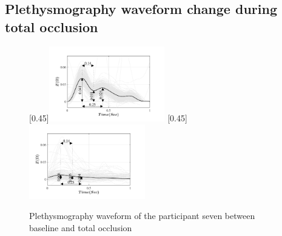 \subsection{Plethysmography waveform change during total occlusion}
\label{section apa 2.3}
\begin{figure}
	\centering
	\null\hfill%
	[0.45\textwidth]{\includegraphics[width=0.45\textwidth, trim={0.5cm 0cm 1.5cm 0 cm}, clip]{figure_apa_6a}}%
	\hfill%
	[0.45\textwidth]{\includegraphics[width=0.45\textwidth, trim={0.5cm 0cm 1.5cm 0 cm}, clip]{figure_apa_6b}}%
	\hfill\null%
	\caption{Plethysmography waveform of the participant seven between baseline and total occlusion}
	\label{fig:iPG_total}
	
	\vspace{1cm}
	

\end{figure}
